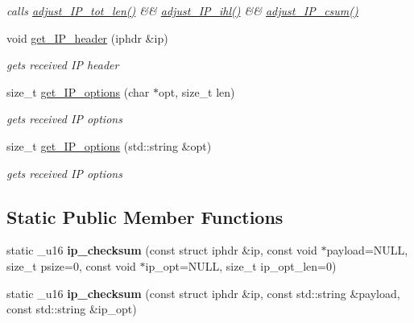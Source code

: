\begin{CompactItemize}
\begin{CompactList}\small\item\em calls \hyperlink{classsocketpp_1_1IP__RawSocket_32d2c08139fb43abb92679bdabecf778}{adjust\_\-IP\_\-tot\_\-len()} \&\& \hyperlink{classsocketpp_1_1IP__RawSocket_d84d5e193a15baf421c64011a9c27359}{adjust\_\-IP\_\-ihl()} \&\& \hyperlink{classsocketpp_1_1IP__RawSocket_187bab79c6a8bae17b400a132063a9d1}{adjust\_\-IP\_\-csum()} \item\end{CompactList}\item 
void \hyperlink{classsocketpp_1_1IP__RawSocket_e477f483d5a8baa76c60399d0809d043}{get\_\-IP\_\-header} (iphdr \&ip)
\begin{CompactList}\small\item\em gets received IP header \item\end{CompactList}\item 
size\_\-t \hyperlink{classsocketpp_1_1IP__RawSocket_686fcc72997b0843b2ece0c4d8a5735d}{get\_\-IP\_\-options} (char $\ast$opt, size\_\-t len)
\begin{CompactList}\small\item\em gets received IP options \item\end{CompactList}\item 
size\_\-t \hyperlink{classsocketpp_1_1IP__RawSocket_c9bec0c1db60871bb1cb5560b97e02ed}{get\_\-IP\_\-options} (std::string \&opt)
\begin{CompactList}\small\item\em gets received IP options \item\end{CompactList}\end{CompactItemize}
\subsection*{Static Public Member Functions}
\begin{CompactItemize}
\item 
\hypertarget{classsocketpp_1_1IP__RawSocket_91cc7b27ebb5eb8da6be6cdd14087f21}{
static \_\-u16 \textbf{ip\_\-checksum} (const struct iphdr \&ip, const void $\ast$payload=NULL, size\_\-t psize=0, const void $\ast$ip\_\-opt=NULL, size\_\-t ip\_\-opt\_\-len=0)}
\label{classsocketpp_1_1IP__RawSocket_91cc7b27ebb5eb8da6be6cdd14087f21}

\item 
\hypertarget{classsocketpp_1_1IP__RawSocket_6b48548362fb5509bbba7d36e9ffdb5d}{
static \_\-u16 \textbf{ip\_\-checksum} (const struct iphdr \&ip, const std::string \&payload, const std::string \&ip\_\-opt)}
\label{classsocketpp_1_1IP__RawSocket_6b48548362fb5509bbba7d36e9ffdb5d}

\end{CompactItemize}
